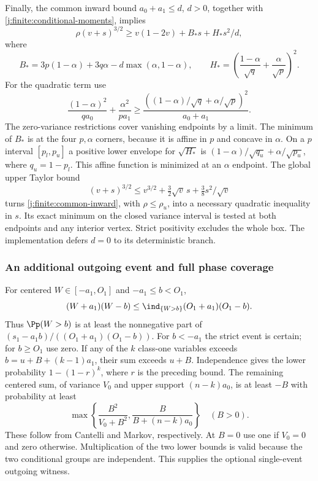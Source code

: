Finally, the common inward bound $a_0+a_1\le d$, $d>0$,
together with \eqref{j:finite:conditional-moments}, implies
\begin{equation}\label{j:finite:common-inward}
 \rho(v+s)^{3/2}\ge v(1-2v)+B_*s+H_*s^2/d,
\end{equation}
where
\[
 B_*=3p(1-\alpha)+3q\alpha-d\max(\alpha,1-\alpha),\qquad
 H_*=\left(\frac{1-\alpha}{\sqrt q}+\frac\alpha{\sqrt p}\right)^2.
\]
For the quadratic term use
\[
 \frac{(1-\alpha)^2}{qa_0}+\frac{\alpha^2}{pa_1}
 \ge\frac{((1-\alpha)/\sqrt q+\alpha/\sqrt p)^2}{a_0+a_1}.
\]
The zero-variance restrictions cover vanishing endpoints by a limit.
The minimum of $B_*$ is at the four $p,\alpha$ corners, because it is
affine in $p$ and concave in $\alpha$.
On a $p$ interval $[p_l,p_u]$ a positive lower envelope for
$\sqrt{H_*}$ is $(1-\alpha)/\sqrt{q_u}+\alpha/\sqrt{p_u}$,
where $q_u=1-p_l$. This affine function is minimized at an
$\alpha$ endpoint. The global upper Taylor bound
\[
 (v+s)^{3/2}\le v^{3/2}+\tfrac32\sqrt v\,s
                                      +\tfrac38s^2/\sqrt v
\]
turns \eqref{j:finite:common-inward}, with $\rho\le\rho_u$, into a
necessary quadratic inequality in $s$. Its exact minimum on the
closed variance interval is tested at both endpoints and any interior
vertex. Strict positivity excludes the whole box. The implementation
defers $d=0$ to its deterministic branch.

\subsubsection{An additional outgoing event and full phase coverage}
For centered $W\in[-a_1,O_1]$ and $-a_1\le b<O_1$,
\[
 (W+a_1)(W-b)\le\ind_{\{W>b\}}(O_1+a_1)(O_1-b).
\]
Thus $\Pp(W>b)$ is at least the nonnegative part of
$(s_1-a_1b)/((O_1+a_1)(O_1-b))$.
For $b<-a_1$ the strict event is certain; for $b\ge O_1$ use zero.
If any of the $k$ class-one variables exceeds
$b=u+B+(k-1)a_1$, their sum exceeds $u+B$.
Independence gives the lower probability $1-(1-r)^k$, where $r$
is the preceding bound. The remaining centered sum, of variance $V_0$
and upper support $(n-k)a_0$, is at least $-B$ with probability at
least
\[
 \max\left\{\frac{B^2}{V_0+B^2},
                         \frac{B}{B+(n-k)a_0}\right\}\quad(B>0).
\]
These follow from Cantelli and Markov, respectively. At $B=0$ use
one if $V_0=0$ and zero otherwise. Multiplication of the two lower
bounds is valid because the two conditional groups are independent.
This supplies the optional single-event outgoing witness.

